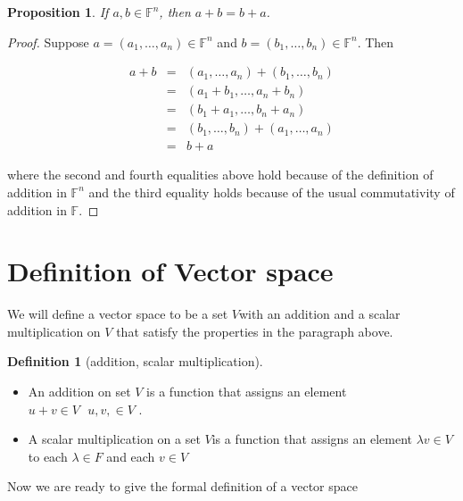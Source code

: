 \documentclass[
]{book}
\providecommand{\tightlist}{%
  \setlength{\itemsep}{0pt}\setlength{\parskip}{0pt}}
\newtheorem{proposition}{Proposition}[chapter]
\theoremstyle{definition}
\newtheorem{definition}{Definition}[chapter]
\theoremstyle{definition}
\theoremstyle{definition}
\theoremstyle{definition}
\theoremstyle{remark}
\begin{document}
\begin{proposition}
\protect\hypertarget{prp:unnamed-chunk-12}{}\label{prp:unnamed-chunk-12}If \(a, b \in \mathbb{F}^n\), then \(a+b=b+a\).
\end{proposition}

\begin{proof}
Suppose \(a = (a_1, …, a_n) \in \mathbb{F}^n\) and \(b = (b_1, …, b_n) \in \mathbb{F}^n\). Then

\begin{eqnarray}
a+b
&=& (a_1,…,a_n) + (b_1,…,b_n)\\
&=& (a_1 + b_1, …, a_n + b_n)\\
&=& (b_1 + a_1, …, b_n + a_n)\\
&=& (b_1,…,b_n) + (a_1,…,a_n)\\
&=& b+a
\end{eqnarray}

where the second and fourth equalities above hold because of the definition of addition in \(\mathbb{F}^n\) and the third equality holds because of the usual commutativity of addition in \(\mathbb{F}\).
\end{proof}

\section{Definition of Vector space}\label{definition-of-vector-space}

We will define a vector space to be a set \(V\)with an addition and a scalar multiplication on \(V\) that satisfy the properties in the paragraph above.

\begin{definition}[addition, scalar multiplication]
\protect\hypertarget{def:unnamed-chunk-14}{}\label{def:unnamed-chunk-14}\leavevmode

\begin{itemize}
\tightlist
\item
  An addition on set \(V\) is a function that assigns an element \(u+v\in V ~~~ u,v,\in V\) .
\item
  A scalar multiplication on a set \(V\)is a function that assigns an element \(\lambda v \in V\) to each \(\lambda\in F\) and each \(v \in V\)
\end{itemize}

\end{definition}

Now we are ready to give the formal definition of a vector space
\end{document}
